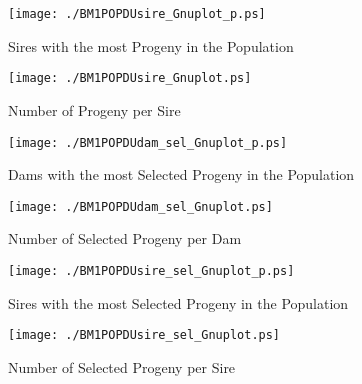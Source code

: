 \begin{figure}[h]
\begin{center}{
\caption{Sires with the most Progeny in the Population}
  \texttt{[image: ./BM1POPDUsire\_Gnuplot\_p.ps]}
  }\end{center}
  \end{figure}
  

\begin{figure}[h]
\begin{center}{
\caption{Number of Progeny per Sire }
  \texttt{[image: ./BM1POPDUsire\_Gnuplot.ps]}
  }\end{center}
  \end{figure}
  

\begin{figure}[h]
\begin{center}{
\caption{Dams with the most Selected Progeny in the Population}
  \texttt{[image: ./BM1POPDUdam\_sel\_Gnuplot\_p.ps]}
  }\end{center}
  \end{figure}
  

\begin{figure}[h]
\begin{center}{
\caption{Number of Selected Progeny per Dam}
  \texttt{[image: ./BM1POPDUdam\_sel\_Gnuplot.ps]}
  }\end{center}
  \end{figure}
  

\begin{figure}[h]
\begin{center}{
\caption{Sires with the most Selected Progeny in the Population}
  \texttt{[image: ./BM1POPDUsire\_sel\_Gnuplot\_p.ps]}
  }\end{center}
  \end{figure}
  

\begin{figure}[h]
\begin{center}{
\caption{Number of Selected Progeny per Sire}
  \texttt{[image: ./BM1POPDUsire\_sel\_Gnuplot.ps]}
  }\end{center}
  \end{figure}
  

